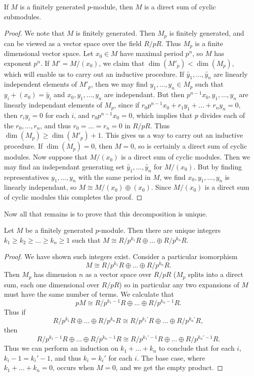 \begin{lemma}
    If $M$ is a finitely generated $p$-module, then $M$ is a direct sum of cyclic submodules.
\end{lemma}
\begin{proof}
    We note that $M$ is finitely generated. Then $M_p$ is finitely generated, and can be viewed as a vector space over the field $R/pR$. Thus $M_p$ is a finite dimensional vector space. Let $x_0 \in M$ have maximal period $p^n$, so $M$ has exponent $p^n$. If $M' = M/(x_0)$, we claim that $\dim(M'_p) < \dim(M_p)$, which will enable us to carry out an inductive procedure. If $\tilde{y_1},\dots,\tilde{y_n}$ are linearly independent elements of $M'_p$, then we may find $y_1,\dots,y_n \in M_p$ such that $y_i + (x_0) = \tilde{y_i}$ and $x_0,y_1,\dots,y_n$ are independant. But then $p^{n-1}x_0, y_1,\dots, y_n$ are linearly independant elements of $M_p$, since if $r_0p^{n-1}x_0 + r_1y_1 + \dots + r_ny_n = 0$, then $r_iy_i = 0$ for each $i$, and $r_0p^{n-1}x_0 = 0$, which implies that $p$ divides each of the $r_0,\dots,r_n$, and thus $r_0 = \dots = r_n = 0$ in $R/pR$. Thus $\dim(M_p) \geq \dim(M'_p) + 1$. This gives us a way to carry out an inductive procedure. If $\dim(M_p) = 0$, then $M = 0$, so is certainly a direct sum of cyclic modules. Now suppose that $M/(x_0)$ is a direct sum of cyclic modules. Then we may find an independant generating set $\tilde{y_1}, \dots, \tilde{y_n}$ for $M/(x_0)$. But by finding representatives $y_1,\dots,y_n$ with the same period in $M$, we find $x_0,y_1,\dots,y_n$ is linearly independant, so $M \cong M/(x_0) \oplus (x_0)$. Since $M/(x_0)$ is a direct sum of cyclic modules this completes the proof.
\end{proof}

Now all that remains is to prove that this decomposition is unique.

\begin{lemma}
    Let $M$ be a finitely generated $p$-module. Then there are unique integers $k_1 \geq k_2 \geq \dots \geq k_n \geq 1$ such that $M \cong R/p^{k_1}R \oplus \dots \oplus R/p^{k_n}R$.
\end{lemma}
\begin{proof}
    We have shown such integers exist. Consider a particular isomorphism
    \[ M \cong R/p^{k_1}R \oplus \dots \oplus R/p^{k_n}R. \]
    Then $M_p$ has dimension $n$ as a vector space over $R/pR$ ($M_p$ splits into a direct sum, each one dimensional over $R/pR$) so in particular any two expansions of $M$ must have the same number of terms. We calculate that
    \[ pM \cong R/p^{k_1-1}R \oplus \dots \oplus R/p^{k_n-1}R. \]
    Thus if
    \[ R/p^{k_1}R \oplus \dots \oplus R/p^{k_n}R \cong R/p^{k_1'}R \oplus \dots \oplus R/p^{k_n'}R, \]
    then
    \[ R/p^{k_1-1}R \oplus \dots \oplus R/p^{k_n-1}R \cong R/p^{k_1'-1}R \oplus \dots \oplus R/p^{k_n'-1}R. \]
    Thus we can perform an induction on $k_1 + \dots + k_n$ to conclude that for each $i$, $k_i-1=k_i'-1$, and thus $k_i = k_i'$ for each $i$. The base case, where $k_1 + \dots + k_n = 0$, occurs when $M = 0$, and we get the empty product.
\end{proof}

